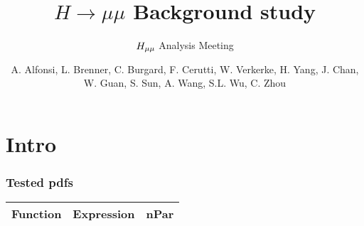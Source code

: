\documentclass[xcolor={x11names}]{beamer}
\title{\textbf{$H\to\mu\mu$ Background study}}
\subtitle{$H\sb{\mu\mu}$ Analysis Meeting}
\author{A. Alfonsi, L. Brenner, C. Burgard, F. Cerutti, W. Verkerke, H. Yang, J. Chan, W. Guan, S. Sun, A. Wang, S.L. Wu, C. Zhou}
\begin{document}
\frame{\maketitle}


\section{Intro}
\begin{frame}[fragile,shrink=25]
\frametitle{Tested pdfs}
\begin{table}
{
\centering

\begin{tabular}{l l c}
\textcolor{Red3}{\textbf{Function}} & \textcolor{Red3}{\textbf{Expression}} & \textcolor{Red3}{\textbf{nPar}} \\
\midrule


\end{tabular}}
\end{table}
\end{frame}
\end{document}
